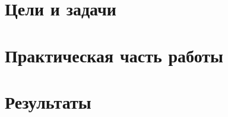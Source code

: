 \documentclass[a4paper, 14pt, report]{ncc}
\begin{document}
\def\chaptername{Часть}
\def\contentsname{Содержание}



\tableofcontents
\clearpage	


\chapter[Цели и задачи]{Цели и задачи}


\chapter[Практическая часть работы]{Практическая часть работы}



\chapter[Результаты]{Результаты}

\end{document}
